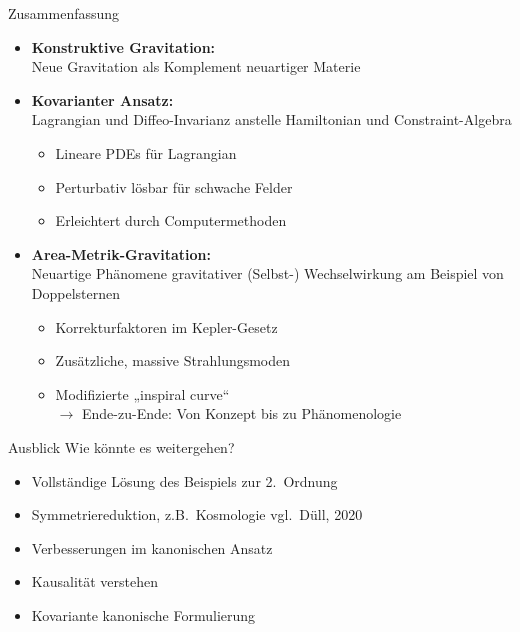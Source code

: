 \documentclass{beamer}
\begin{document}
    \begin{frame}{Zusammenfassung}
        \begin{itemize}
            \item \textbf{Konstruktive Gravitation:} \\ Neue Gravitation als Komplement neuartiger Materie \pause
            \item \textbf{Kovarianter Ansatz:} \\
            Lagrangian und Diffeo-Invarianz anstelle Hamiltonian und Constraint-Algebra
            \begin{itemize}
                \item Lineare PDEs für Lagrangian
                \item Perturbativ lösbar für schwache Felder
                \item Erleichtert durch Computermethoden
            \end{itemize} \pause
            \item \textbf{Area-Metrik-Gravitation:} \\
            Neuartige Phänomene gravitativer (Selbst-) Wechselwirkung am Beispiel von Doppelsternen
            \begin{itemize}
                \item Korrekturfaktoren im Kepler-Gesetz
                \item Zusätzliche, massive Strahlungsmoden
                \item Modifizierte „inspiral curve“ \pause \\
                \alert{$\rightarrow$ Ende-zu-Ende: Von Konzept bis zu Phänomenologie}
            \end{itemize}
        \end{itemize}
    \end{frame}

    \begin{frame}{Ausblick}
        Wie könnte es weitergehen?
        \begin{itemize}
            \item Vollständige Lösung des Beispiels zur 2.\ Ordnung
            \item Symmetriereduktion, z.B.\ Kosmologie {\scriptsize \lbrack vgl.\ Düll, 2020\rbrack}
            \item Verbesserungen im kanonischen Ansatz
            \item Kausalität verstehen
            \item Kovariante kanonische Formulierung
        \end{itemize}
    \end{frame}
\end{document}
